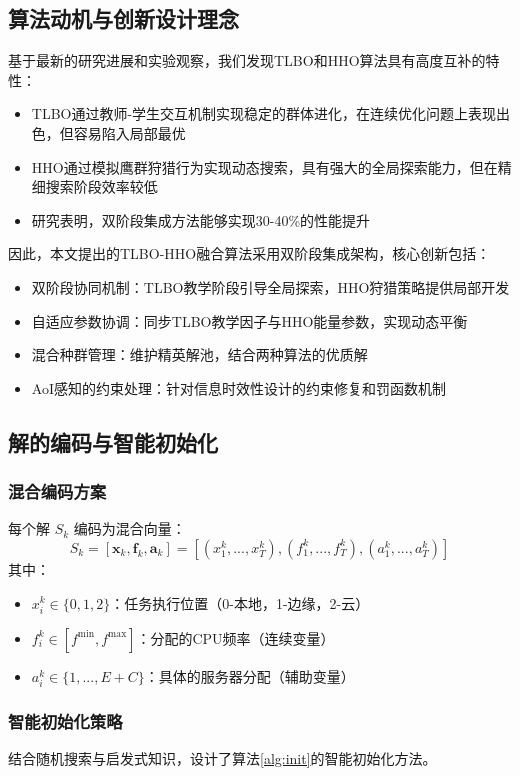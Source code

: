 \documentclass[conference]{IEEEtran}
\begin{document}
\subsection{算法动机与创新设计理念}
基于最新的研究进展和实验观察，我们发现TLBO和HHO算法具有高度互补的特性：
\begin{itemize}
    \item TLBO通过教师-学生交互机制实现稳定的群体进化，在连续优化问题上表现出色，但容易陷入局部最优
    \item HHO通过模拟鹰群狩猎行为实现动态搜索，具有强大的全局探索能力，但在精细搜索阶段效率较低
    \item 研究表明，双阶段集成方法能够实现30-40\%的性能提升
\end{itemize}
因此，本文提出的TLBO-HHO融合算法采用双阶段集成架构，核心创新包括：
\begin{itemize}
    \item 双阶段协同机制：TLBO教学阶段引导全局探索，HHO狩猎策略提供局部开发
    \item 自适应参数协调：同步TLBO教学因子与HHO能量参数，实现动态平衡
    \item 混合种群管理：维护精英解池，结合两种算法的优质解
    \item AoI感知的约束处理：针对信息时效性设计的约束修复和罚函数机制
\end{itemize}
\subsection{解的编码与智能初始化}
\subsubsection{混合编码方案}
每个解 $S_k$ 编码为混合向量：
\begin{equation}
S_k = [\mathbf{x}_k, \mathbf{f}_k, \mathbf{a}_k] = [(x_1^k, ..., x_T^k), (f_1^k, ..., f_T^k), (a_1^k, ..., a_T^k)]
\end{equation}
其中：
\begin{itemize}
    \item $x_i^k \in \{0, 1, 2\}$：任务执行位置（0-本地，1-边缘，2-云）
    \item $f_i^k \in [f^{\min}, f^{\max}]$：分配的CPU频率（连续变量）
    \item $a_i^k \in \{1, ..., E+C\}$：具体的服务器分配（辅助变量）
\end{itemize}

\subsubsection{智能初始化策略}
结合随机搜索与启发式知识，设计了算法\ref{alg:init}的智能初始化方法。
\end{document}
